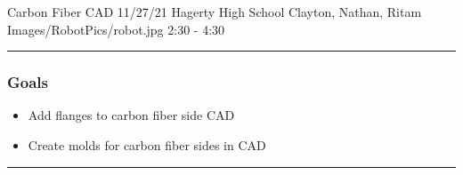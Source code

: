 \insertmeeting 
	{Carbon Fiber CAD} 
	{11/27/21}
	{Hagerty High School}
	{Clayton, Nathan, Ritam}
	{Images/RobotPics/robot.jpg}
	{2:30 - 4:30}
	
\noindent\hfil\rule{\textwidth}{.4pt}\hfil
\subsubsection*{Goals}
\begin{itemize}
    \item Add flanges to carbon fiber side CAD
    \item Create molds for carbon fiber sides in CAD
 

\end{itemize} 

\noindent\hfil\rule{\textwidth}{.4pt}\hfil

